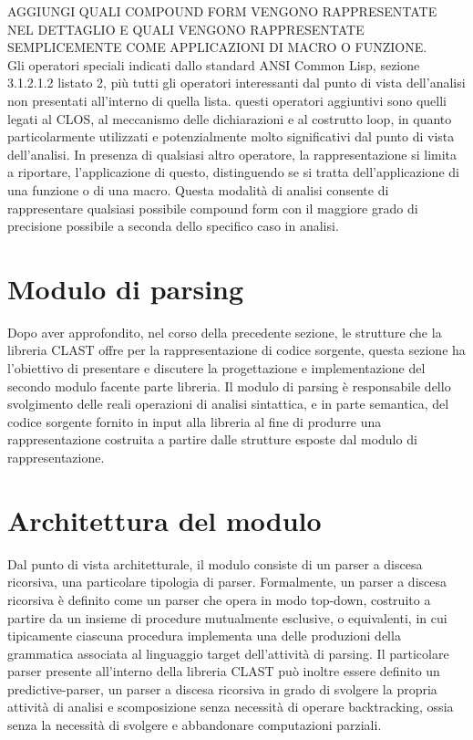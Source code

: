 AGGIUNGI QUALI COMPOUND FORM VENGONO RAPPRESENTATE NEL DETTAGLIO E QUALI
VENGONO RAPPRESENTATE SEMPLICEMENTE COME APPLICAZIONI DI MACRO O FUNZIONE.\\

Gli operatori speciali indicati dallo standard ANSI Common Lisp, sezione
3.1.2.1.2 listato 2, più tutti gli operatori interessanti dal punto di vista
dell’analisi non presentati all’interno di quella lista. questi operatori
aggiuntivi sono quelli legati al CLOS, al meccanismo delle dichiarazioni e al
costrutto loop, in quanto particolarmente utilizzati e potenzialmente molto
significativi dal punto di vista dell’analisi. In presenza di qualsiasi altro
operatore, la rappresentazione si limita a riportare, l’applicazione di
questo, distinguendo se si tratta dell’applicazione di una funzione o di una
macro. Questa modalità di analisi consente di rappresentare qualsiasi
possibile compound form con il maggiore grado di precisione possibile a
seconda dello specifico caso in analisi.

\section{Modulo di parsing}

Dopo aver approfondito, nel corso della precedente sezione, le strutture che
la libreria CLAST offre per la rappresentazione di codice sorgente, questa
sezione ha l’obiettivo di presentare e discutere la progettazione e
implementazione del secondo modulo facente parte libreria. Il modulo di
parsing è responsabile dello svolgimento delle reali operazioni di analisi
sintattica, e in parte semantica, del codice sorgente fornito in input alla
libreria al fine di produrre una rappresentazione costruita a partire dalle
strutture esposte dal modulo di rappresentazione.

\section{Architettura del modulo}

Dal punto di vista architetturale, il modulo consiste di un parser a discesa
ricorsiva, una particolare tipologia di parser. Formalmente, un parser a
discesa ricorsiva è definito come un parser che opera in modo top-down,
costruito a partire da un insieme di procedure mutualmente esclusive, o
equivalenti, in cui tipicamente ciascuna procedura implementa una delle
produzioni della grammatica associata al linguaggio target dell’attività di
parsing. Il particolare parser presente all’interno della libreria CLAST può
inoltre essere definito un predictive-parser, un parser a discesa ricorsiva in
grado di svolgere la propria attività di analisi e scomposizione senza
necessità di operare backtracking, ossia senza la necessità di svolgere e
abbandonare computazioni parziali.\\

